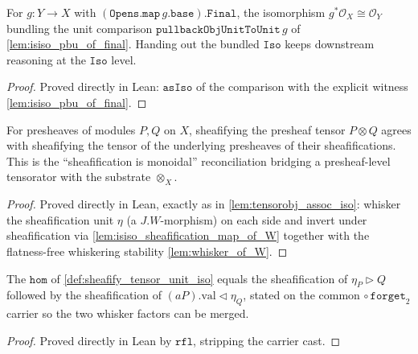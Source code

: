 \begin{definition}
  \label{def:pullback_obj_unit_to_unit_iso}
  For \(g : Y \to X\) with \((\mathtt{Opens.map}\,g.\mathtt{base}).\mathtt{Final}\), the
  isomorphism \(g^*\mathcal{O}_X \cong \mathcal{O}_Y\) bundling the unit comparison
  \(\mathtt{pullbackObjUnitToUnit}\,g\) of \cref{lem:isiso_pbu_of_final}. Handing out the
  bundled \(\mathtt{Iso}\) keeps downstream reasoning at the \(\mathtt{Iso}\) level.
\end{definition}
\begin{proof}
  \leanok
  Proved directly in Lean: \(\mathtt{asIso}\) of the comparison with the explicit witness
  \cref{lem:isiso_pbu_of_final}.
\end{proof}

\begin{definition}
  \label{def:sheafify_tensor_unit_iso}
  For presheaves of modules \(P,Q\) on \(X\), sheafifying the presheaf tensor \(P \otimes Q\)
  agrees with sheafifying the tensor of the underlying presheaves of their sheafifications.
  This is the ``sheafification is monoidal'' reconciliation bridging a presheaf-level
  tensorator with the substrate \(\otimes_X\).
\end{definition}
\begin{proof}
  \leanok
  Proved directly in Lean, exactly as in \cref{lem:tensorobj_assoc_iso}: whisker the
  sheafification unit \(\eta\) (a \(J.W\)-morphism) on each side and invert under
  sheafification via \cref{lem:isiso_sheafification_map_of_W} together with the
  flatness-free whiskering stability \cref{lem:whisker_of_W}.
\end{proof}

\begin{lemma}
  \label{lem:sheafify_tensor_unit_iso_hom_eq}
  The \(\mathtt{hom}\) of \cref{def:sheafify_tensor_unit_iso} equals the sheafification of
  \(\eta_P \rhd Q\) followed by the sheafification of \((aP).\mathrm{val} \lhd \eta_Q\),
  stated on the common \(\circ\,\mathtt{forget}_2\) carrier so the two whisker factors can
  be merged.
\end{lemma}
\begin{proof}
  \leanok
  Proved directly in Lean by \(\mathtt{rfl}\), stripping the carrier cast.
\end{proof}

